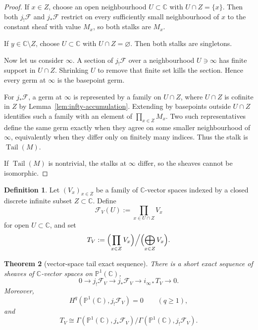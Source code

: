 \documentclass[11pt,a4paper]{article}
\newtheorem{theorem}{Theorem}[section]
\theoremstyle{definition}
\newtheorem{definition}[theorem]{Definition}
\theoremstyle{remark}
\DeclareMathOperator{\Tail}{Tail}
\newcommand{\CC}{\mathbb C}
\newcommand{\PP}{\mathbb P}
\newcommand{\cF}{\mathcal F}
\begin{document}
\begin{proof}
If $x\in Z$, choose an open neighbourhood $U\subset \CC$ with $U\cap Z=\{x\}$. Then both $j_!\cF$ and $j_*\cF$ restrict on every sufficiently small neighbourhood of $x$ to the constant sheaf with value $M_x$, so both stalks are $M_x$.

If $y\in \CC\setminus Z$, choose $U\subset\CC$ with $U\cap Z=\varnothing$. Then both stalks are singletons.

Now let us consider $\infty$. A section of $j_!\cF$ over a neighbourhood $U\ni\infty$ has finite support in $U\cap Z$. Shrinking $U$ to remove that finite set kills the section. Hence every germ at $\infty$ is the basepoint germ.

For $j_*\cF$, a germ at $\infty$ is represented by a family on $U\cap Z$, where $U\cap Z$ is cofinite in $Z$ by Lemma~\ref{lem:infty-accumulation}. Extending by basepoints outside $U\cap Z$ identifies such a family with an element of $\prod_{x\in Z}M_x$. Two such representatives define the same germ exactly when they agree on some smaller neighbourhood of $\infty$, equivalently when they differ only on finitely many indices. Thus the stalk is $\Tail(M)$.

If $\Tail(M)$ is nontrivial, the stalks at $\infty$ differ, so the sheaves cannot be isomorphic.
\end{proof}

\begin{definition}
Let $(V_x)_{x\in Z}$ be a family of $\CC$-vector spaces indexed by a closed discrete infinite subset $Z\subset\CC$. Define
\[
\cF_V(U):=\prod_{x\in U\cap Z}V_x
\]
for open $U\subset\CC$, and set
\[
T_V:=\Bigl(\prod_{x\in Z}V_x\Bigr)\Big/\Bigl(\bigoplus_{x\in Z}V_x\Bigr).
\]
\end{definition}

\begin{theorem}[vector-space tail exact sequence]\label{thm:vector-tail}
There is a short exact sequence of sheaves of $\CC$-vector spaces on $\PP^1(\CC)$,
\[
0\longrightarrow j_!\cF_V\longrightarrow j_*\cF_V\longrightarrow i_{\infty *}T_V\longrightarrow 0.
\]
Moreover,
\[
H^q\!\left(\PP^1(\CC),j_!\cF_V\right)=0\qquad (q\ge1),
\]
and
\[
T_V\cong \Gamma\!\left(\PP^1(\CC),j_*\cF_V\right)\Big/\Gamma\!\left(\PP^1(\CC),j_!\cF_V\right).
\]
\end{theorem}
\end{document}
